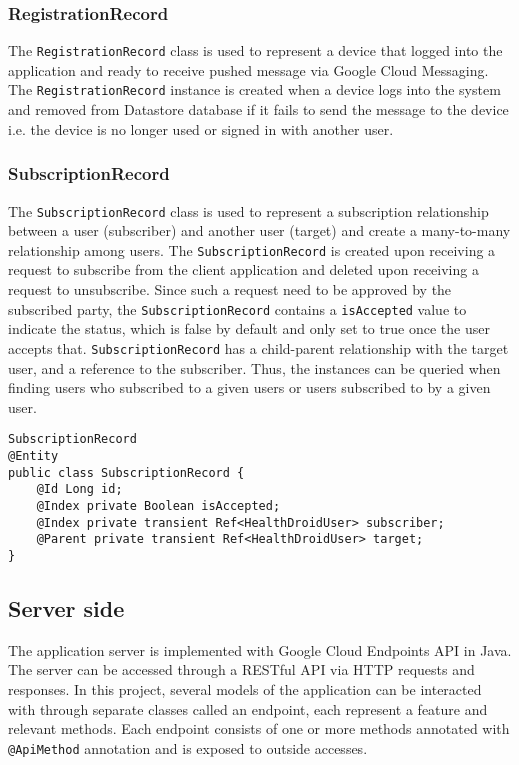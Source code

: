 \subsubsection{RegistrationRecord}
The \texttt{RegistrationRecord} class is used to represent a device that logged into the application and ready to receive
pushed message via Google Cloud Messaging.  The \texttt{RegistrationRecord} instance is created when a device logs into the
system and removed from Datastore database if it fails to send the message to the device i.e. the device is no longer
used or signed in with another user.

\subsubsection{SubscriptionRecord}
The \texttt{SubscriptionRecord} class is used to represent a subscription relationship between a user (subscriber) and
another user (target) and create a many-to-many relationship among users. The \texttt{SubscriptionRecord} is created
upon receiving a request to subscribe from the client application and deleted upon receiving a request to unsubscribe.
Since such a request need to be approved by the subscribed party, the \texttt{SubscriptionRecord} contains a
\texttt{isAccepted} value to indicate the status, which is false by default and only set to true once the user accepts
that. \texttt{SubscriptionRecord} has a child-parent relationship with the target user, and a reference to the
subscriber. Thus, the instances can be queried when finding users who subscribed to a given users or users subscribed to
by a given user.

\begin{minipage}{\linewidth}
\begin{lstlisting}SubscriptionRecord
@Entity
public class SubscriptionRecord {
    @Id Long id;
    @Index private Boolean isAccepted;
    @Index private transient Ref<HealthDroidUser> subscriber;
    @Parent private transient Ref<HealthDroidUser> target;
}
\end{lstlisting}
\end{minipage}

\subsection{Server side}
The application server is implemented with Google Cloud Endpoints API in Java. The server can be accessed through a
RESTful API via HTTP requests and responses. In this project, several models of the application can be interacted with
through separate classes called an endpoint, each represent a feature and relevant methods. Each endpoint consists of
one or more methods annotated with \texttt{@ApiMethod} annotation and is exposed to outside accesses.

